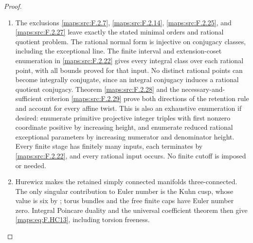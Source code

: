 \begin{proof}
\begin{enumerate}[label=\arabic*.]
\item The exclusions \ref{maps:src:F.2.7}, \ref{maps:src:F.2.14}, \ref{maps:src:F.2.25}, and \ref{maps:src:F.2.27}
leave exactly the stated minimal orders and rational
quotient problem.
The rational normal form is injective on conjugacy
classes, including the exceptional line.
The finite interval and extension-coset enumeration
in \ref{maps:src:F.2.22} gives every integral class over each rational
point, with all bounds proved for that input.
No distinct rational points can become integrally
conjugate, since an integral conjugacy induces a
rational quotient conjugacy.
Theorem \ref{maps:src:F.2.28} and the necessary-and-sufficient
criterion \ref{maps:src:F.2.29} prove both directions of the
retention rule and account for every affine twist.
This is also an exhaustive enumeration if desired:
enumerate primitive projective integer triples with
first nonzero coordinate positive by increasing height,
and enumerate reduced rational exceptional parameters
by increasing numerator and denominator height.
Every finite stage has finitely many inputs, each
terminates by \ref{maps:src:F.2.22}, and every rational input occurs.
No finite cutoff is imposed or needed.

\item Hurewicz makes the retained simply connected manifolds
three-connected.  The only singular contribution to
Euler number is the Kuhn cusp, whose value is six
by ; torus bundles and the free finite caps have
Euler number zero.
Integral Poincare duality and the universal coefficient
theorem then give \eqref{maps:eq:F.HC13}, including torsion freeness.


\end{enumerate}
\end{proof}
